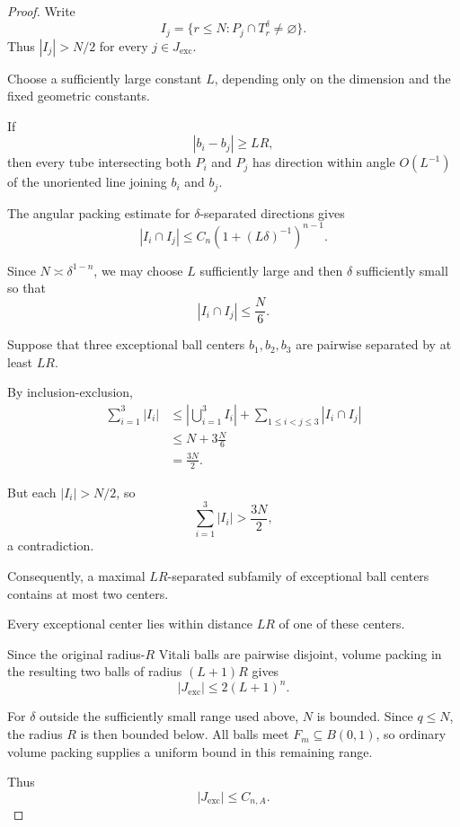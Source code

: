 \documentclass[11pt, letterpaper]{nyjm}
\begin{document}
	\begin{proof}
		Write
		\[
		I_j=\{r\le N:P_j\cap T_r^\delta
		\ne\varnothing\}.
		\]
		Thus $|I_j|>N/2$ for every
		$j\in J_{\mathrm{exc}}$.
		
		Choose a sufficiently large constant
		$L$, depending only on the dimension
		and the fixed geometric constants.
		
		If
		\[
		|b_i-b_j|\ge LR,
		\]
		then every tube intersecting both
		$P_i$ and $P_j$ has direction within
		angle $O(L^{-1})$ of the unoriented
		line joining $b_i$ and $b_j$.
		
		The angular packing estimate for
		$\delta$-separated directions gives
		\[
		|I_i\cap I_j|
		\le C_n(1+(L\delta)^{-1})^{n-1}.
		\]
		
		Since $N\asymp\delta^{1-n}$,
		we may choose $L$ sufficiently large
		and then $\delta$ sufficiently small
		so that
		\[
		|I_i\cap I_j|\le \frac N6.
		\]
		
		Suppose that three exceptional
		ball centers $b_1,b_2,b_3$
		are pairwise separated by at least $LR$.
		
		By inclusion-exclusion,
		\[
		\begin{aligned}
			\sum_{i=1}^3|I_i|
			&\le
			\left|\bigcup_{i=1}^3 I_i\right|
			+\sum_{1\le i<j\le3}|I_i\cap I_j|\\
			&\le N+3\frac N6\\
			&=\frac{3N}{2}.
		\end{aligned}
		\]
		
		But each $|I_i|>N/2$, so
		\[
		\sum_{i=1}^3|I_i|>\frac{3N}{2},
		\]
		a contradiction.
		
		Consequently, a maximal
		$LR$-separated subfamily of
		exceptional ball centers contains
		at most two centers.
		
		Every exceptional center lies within
		distance $LR$ of one of these centers.
		
		Since the original radius-$R$
		Vitali balls are pairwise disjoint,
		volume packing in the resulting
		two balls of radius $(L+1)R$ gives
		\[
		|J_{\mathrm{exc}}|
		\le 2(L+1)^n.
		\]
		
		For $\delta$ outside the sufficiently
		small range used above, $N$ is bounded.
		Since $q\le N$, the radius $R$ is then
		bounded below. All balls meet
		$F_m\subseteq B(0,1)$, so ordinary
		volume packing supplies a uniform
		bound in this remaining range.
		
		Thus
		\[
		|J_{\mathrm{exc}}|\le C_{n,A}.
		\]
	\end{proof}
		
\end{document}
